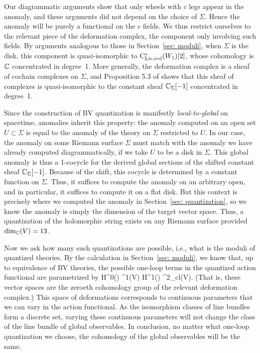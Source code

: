 Our diagrammatic arguments show that only wheels with $c$ legs appear in the anomaly,
and these arguments did not depend on the choice of $\Sigma$. 
Hence the anomaly will be purely a functional on the $c$ fields.
We thus restrict ourselves to the relevant piece of the deformation complex,
the component only involving such fields.
By arguments analogous to those in Section~\ref{sec: moduli}, 
when $\Sigma$ is the disk,
this component is quasi-isomorphic to ${\rm C}_{\rm Lie,red}^*(W_1)[2]$,
whose cohomology is $\mathbb C$ concentrated in degree~1.
More generally, the deformation complex is a sheaf of cochain complexes on $\Sigma$, 
and Proposition 5.3 of \cite{BWvir} shows that this sheaf of complexes is quasi-isomorphic to the constant sheaf $\mathbb C_\Sigma[-1]$ concentrated in degree~1. 

Since the construction of BV quantization is manifestly {\em local-to-global} on spacetime, 
anomalies inherit this property: 
the anomaly computed on an open set $U \subset \Sigma$ is equal to the anomaly of the theory on $\Sigma$ restricted to $U$. 
In our case, the anomaly on some Riemann surface $\Sigma$ must match with the anomaly we have already computed diagrammatically, if we take $U$ to be a disk in $\Sigma$.
This global anomaly is thus a 1-cocycle for the derived global sections of the shifted constant sheaf $\mathbb C_\Sigma[-1]$.
Because of the shift, this cocycle is determined by a constant function on $\Sigma$.
Thus, it suffices to compute the anomaly on an arbitrary open,
and in particular, it suffices to compute it on a flat disk. 
But this context is precisely where we computed the anomaly in Section~\ref{sec: quantization}, 
so we know the anomaly is simply the dimension of the target vector space.
Thus, a quantization of the holomorphic string exists on any Riemann surface provided $\dim_{\mathbb C}(V) = 13$. 

Now we ask how many such quantizations are possible,
i.e., what is the moduli of quantized theories.
By the calculation in Section~\ref{sec: moduli}, 
we know that, up to equivalence of BV theories, 
the possible one-loop terms in the quantized action functional are parametrized by
\ben
H^0(\Sigma) \tensor \Omega^1(V) \oplus H^1(\Sigma) \tensor \Omega^2_{cl}(V).
\een 
(That is, these vector spaces are the zeroeth cohomology group of the relevant deformation complex.)
This space of deformations corresponds to continuous parameters that we can vary in the action functional.
As the isomorphism classes of line bundles form a discrete set, 
varying these continuous parameters will not change the class of the line bundle of global observables. 
In conclusion, no matter what one-loop quantization we choose, 
the cohomology of the global observables will be the same.

